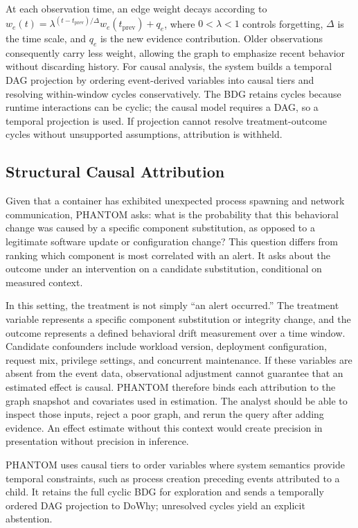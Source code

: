 \documentclass[conference]{IEEEtran}
\begin{document}
At each observation time, an edge weight decays according to $w_e(t)=\lambda^{(t-t_{\mathrm{prev}})/\Delta}w_e(t_{\mathrm{prev}})+q_e$, where $0<\lambda<1$ controls forgetting, $\Delta$ is the time scale, and $q_e$ is the new evidence contribution. Older observations consequently carry less weight, allowing the graph to emphasize recent behavior without discarding history. For causal analysis, the system builds a temporal DAG projection by ordering event-derived variables into causal tiers and resolving within-window cycles conservatively. The BDG retains cycles because runtime interactions can be cyclic; the causal model requires a DAG, so a temporal projection is used. If projection cannot resolve treatment-outcome cycles without unsupported assumptions, attribution is withheld.

\subsection{Structural Causal Attribution}
Given that a container has exhibited unexpected process spawning and network communication, PHANTOM asks: what is the probability that this behavioral change was caused by a specific component substitution, as opposed to a legitimate software update or configuration change? This question differs from ranking which component is most correlated with an alert. It asks about the outcome under an intervention on a candidate substitution, conditional on measured context.

In this setting, the treatment is not simply “an alert occurred.” The treatment variable represents a specific component substitution or integrity change, and the outcome represents a defined behavioral drift measurement over a time window. Candidate confounders include workload version, deployment configuration, request mix, privilege settings, and concurrent maintenance. If these variables are absent from the event data, observational adjustment cannot guarantee that an estimated effect is causal. PHANTOM therefore binds each attribution to the graph snapshot and covariates used in estimation. The analyst should be able to inspect those inputs, reject a poor graph, and rerun the query after adding evidence. An effect estimate without this context would create precision in presentation without precision in inference.

PHANTOM uses causal tiers to order variables where system semantics provide temporal constraints, such as process creation preceding events attributed to a child. It retains the full cyclic BDG for exploration and sends a temporally ordered DAG projection to DoWhy; unresolved cycles yield an explicit abstention.
\end{document}
